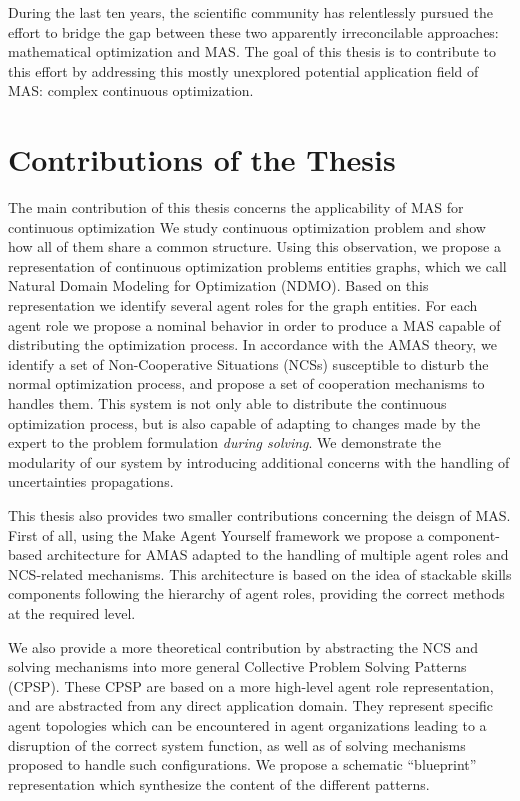 During the last ten years, the scientific community has relentlessly pursued the effort to bridge the gap between these two apparently irreconcilable approaches: mathematical optimization and MAS. The goal of this thesis is to contribute to this effort by addressing this mostly unexplored potential application field of MAS: complex continuous optimization.

\section*{Contributions of the Thesis}

The main contribution of this thesis concerns the applicability of MAS for continuous optimization We study continuous optimization problem and show how all of them share a common structure. Using this observation, we propose a representation of continuous optimization problems entities graphs, which we call Natural Domain Modeling for Optimization (NDMO). Based on this representation we identify several agent roles for the graph entities. For each agent role we propose a nominal behavior in order to produce a MAS capable of distributing the optimization process. In accordance with the AMAS theory, we identify a set of Non-Cooperative Situations (NCSs) susceptible to disturb the normal optimization process, and propose a set of cooperation mechanisms to handles them. This system is not only able to distribute the continuous optimization process, but is also capable of adapting to changes made by the expert to the problem formulation \emph{during solving}. We demonstrate the modularity of our system by introducing additional concerns with the handling of uncertainties propagations.

This thesis also provides two smaller contributions concerning the deisgn of MAS.  First of all, using the Make Agent Yourself framework  we propose a component-based architecture for AMAS adapted to the handling of multiple agent roles and NCS-related mechanisms. This architecture is based on the idea of stackable skills components following the hierarchy of agent roles, providing the correct methods at the required level.

We also provide a more theoretical contribution by abstracting the NCS and solving mechanisms into more general Collective Problem Solving Patterns (CPSP). These CPSP are based on a more high-level agent role representation, and are abstracted from any direct application domain. They represent specific agent topologies which can be encountered in agent organizations leading to a disruption of the correct system function, as well as of solving mechanisms proposed to handle such configurations. We propose a schematic \enquote{blueprint} representation which synthesize the content of the different patterns.

